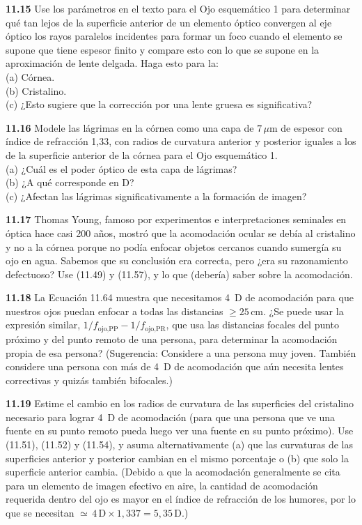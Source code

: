 \documentclass[12pt]{book}
\begin{document}
\textbf{11.15} Use los parámetros en el texto para el Ojo esquemático 1 para determinar qué tan lejos de la superficie anterior de un elemento óptico convergen al eje óptico los rayos paralelos incidentes para formar un foco cuando el elemento se supone que tiene espesor finito y compare esto con lo que se supone en la aproximación de lente delgada. Haga esto para la:\\
(a) Córnea.\\
(b) Cristalino.\\
(c) ¿Esto sugiere que la corrección por una lente gruesa es significativa?

\textbf{11.16} Modele las lágrimas en la córnea como una capa de $7\,\mu\text{m}$ de espesor con índice de refracción 1,33, con radios de curvatura anterior y posterior iguales a los de la superficie anterior de la córnea para el Ojo esquemático 1.\\
(a) ¿Cuál es el poder óptico de esta capa de lágrimas?\\
(b) ¿A qué corresponde en D?\\
(c) ¿Afectan las lágrimas significativamente a la formación de imagen?

\textbf{11.17} Thomas Young, famoso por experimentos e interpretaciones seminales en óptica hace casi 200 años, mostró que la acomodación ocular se debía al cristalino y no a la córnea porque no podía enfocar objetos cercanos cuando sumergía su ojo en agua. Sabemos que su conclusión era correcta, pero ¿era su razonamiento defectuoso? Use (11.49) y (11.57), y lo que (debería) saber sobre la acomodación.

\textbf{11.18} La Ecuación 11.64 muestra que necesitamos 4~D de acomodación para que nuestros ojos puedan enfocar a todas las distancias $\geq 25\,\text{cm}$. ¿Se puede usar la expresión similar, $1/f_{\text{ojo,PP}} - 1/f_{\text{ojo,PR}}$, que usa las distancias focales del punto próximo y del punto remoto de una persona, para determinar la acomodación propia de esa persona? (Sugerencia: Considere a una persona muy joven. También considere una persona con más de 4~D de acomodación que aún necesita lentes correctivas y quizás también bifocales.)

\textbf{11.19} Estime el cambio en los radios de curvatura de las superficies del cristalino necesario para lograr 4~D de acomodación (para que una persona que ve una fuente en su punto remoto pueda luego ver una fuente en su punto próximo). Use (11.51), (11.52) y (11.54), y asuma alternativamente (a) que las curvaturas de las superficies anterior y posterior cambian en el mismo porcentaje o (b) que solo la superficie anterior cambia. (Debido a que la acomodación generalmente se cita para un elemento de imagen efectivo en aire, la cantidad de acomodación requerida dentro del ojo es mayor en el índice de refracción de los humores, por lo que se necesitan ${\simeq}\,4\,\text{D} \times 1{,}337 = 5{,}35\,\text{D}$.)
\end{document}
